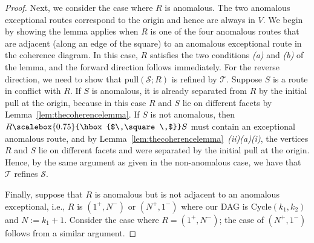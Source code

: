 \documentclass[12pt]{amsart}
\theoremstyle{definition}
\newcommand\calS{\mathcal{S}}
\newcommand\calT{\mathcal{T}}
\newcommand\pull{\mathrm{pull}}
\newcommand\Cycle{\mathrm{Cycle}}
\newcommand\squarette{\scalebox{0.75}{\hbox{$\,\square\,$}}}
\begin{document}
\begin{proof}
     Next, we consider the case where $R$ is anomalous. 
     The two anomalous exceptional routes correspond to the origin and hence are always in $V$. 
     We begin by showing the lemma applies when $R$ is one of the four anomalous routes that are adjacent (along an edge of the square) to an anomalous exceptional route in the coherence diagram. 
     In this case, $R$ satisfies the two conditions \textit{(a)} and \textit{(b)} of the lemma, and the forward direction follows immediately.
     For the reverse direction, we need to show that $\pull(\calS;R)$ is refined by $\calT$.
     Suppose $S$ is a route in conflict with $R$. 
     If $S$ is anomalous, it is already separated from $R$ by the initial pull at the origin, because in this case $R$ and $S$ lie on different facets by Lemma~\ref{lem:thecoherencelemma}.
     If $S$ is not anomalous, then $R\squarette S$ must contain an exceptional anomalous route, and by Lemma~\ref{lem:thecoherencelemma}~\textit{(ii)(a)(i)}, the vertices $R$ and $S$ lie on different facets and were separated by the initial pull at the origin.
     Hence, by the same argument as given in the non-anomalous case, we have that $\calT$ refines $\calS$.
    
    Finally, suppose that $R$ is anomalous but is not adjacent to an anomalous exceptional, i.e., $R$ is $(1^+, N^-)$ or $(N^+, 1^-)$ where our DAG is $\Cycle(k_1,k_2)$ and $N:=k_1+1$.
    Consider the case where $R= (1^+, N^-)$; the case of $(N^+, 1^-)$ follows from a similar argument. 
    

\end{proof}
\end{document}
